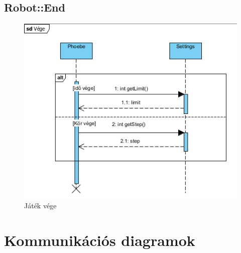 \subsection{Robot::End}
\begin{figure}[h]
\begin{center}
\includegraphics[width=17cm]{images/end.PNG}
\caption{Játék vége}
\label{fig:example11}
\end{center}
\end{figure}
\pagebreak

\section{Kommunikációs diagramok}

